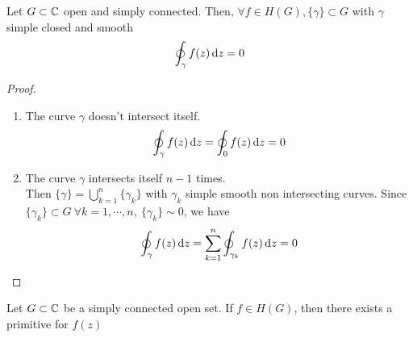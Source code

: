 \documentclass[../complete.tex]{subfiles}
\begin{document}
\begin{thm}
	Let $G\subset\mathbb{C}$ open and simply connected. Then, $\forall f\in H(G), \{\gamma\}\subset G$ with $\gamma$ simple closed and smooth
	\begin{equation*}
		\oint_{\gamma}f(z)\operatorname{d\!} z=0
	\end{equation*}
\end{thm}
\begin{proof}
	\begin{enumerate}
	\item The curve $\gamma$ doesn't intersect itself.
		\begin{equation*}
			\oint_\gamma f(z)\operatorname{d\!} z=\oint_0 f(z)\operatorname{d\!} z=0
		\end{equation*}
	\item The curve $\gamma$ intersects itself $n-1$ times.\\
		Then $\{\gamma\}=\bigcup_{k=1}^n\{\gamma_k\}$ with $\gamma_k$ simple smooth non intersecting curves. Since $\{\gamma_k\}\subset G\ \forall k=1,\cdots,n,\ \{\gamma_k\}\sim0$, we have
		\begin{equation*}
			\oint_\gamma f(z)\operatorname{d\!} z=\sum_{k=1}^n\oint_{\gamma_k}f(z)\operatorname{d\!} z=0
		\end{equation*}
	\end{enumerate}
\end{proof}
\begin{thm}
	Let $G\subset\mathbb{C}$ be a simply connected open set. If $f\in H(G)$, then there exists a primitive for $f(z)$
\end{thm}
\end{document}
